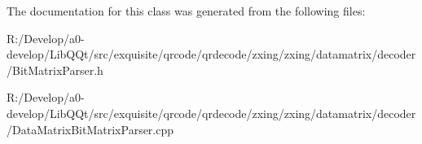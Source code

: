 The documentation for this class was generated from the following files\+:\begin{DoxyCompactItemize}
\item 
R\+:/\+Develop/a0-\/develop/\+Lib\+Q\+Qt/src/exquisite/qrcode/qrdecode/zxing/zxing/datamatrix/decoder/Bit\+Matrix\+Parser.\+h\item 
R\+:/\+Develop/a0-\/develop/\+Lib\+Q\+Qt/src/exquisite/qrcode/qrdecode/zxing/zxing/datamatrix/decoder/Data\+Matrix\+Bit\+Matrix\+Parser.\+cpp\end{DoxyCompactItemize}
